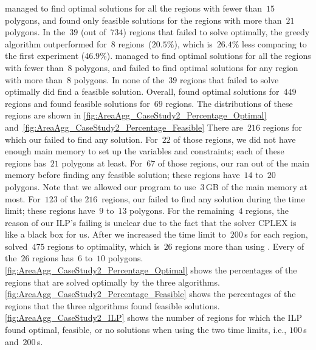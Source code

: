 \Astar managed to find optimal solutions 
for all the regions with fewer than~$15$ polygons, and 
found only feasible solutions for the regions 
with more than~$21$ polygons.
%
In the~$39$ (out of~$734$) regions 
that \Astar failed to solve optimally,
the greedy algorithm outperformed \Astar 
for~$8$ regions~($20.5\%$), 
which is~$26.4\%$ less comparing to the first experiment ($46.9\%$).
%
\ILPOne managed to find optimal solutions 
for all the regions with fewer than~$8$ polygons,
and failed to find optimal solutions
for any region with more than~$8$ polygons.
In none of the~$39$ regions 
that \Astar failed to solve optimally
did \ILPOne find a feasible solution.
Overall, \ILPOne 
found optimal solutions for~$449$ regions
and found feasible solutions for~$69$ regions.
The distributions of these regions are shown in
\figs\ref{fig:AreaAgg_CaseStudy2_Percentage_Optimal}
and~\fig\ref{fig:AreaAgg_CaseStudy2_Percentage_Feasible}
There are~$216$ regions for which 
our \ILPOne failed to find any solution.
For~$22$ of those regions, 
we did not have enough main memory 
to set up the variables and constraints;
each of these regions has~$21$ polygons at least.
For~$67$ of those regions, 
our \ILPOne ran out of the main memory 
before finding any feasible solution;
these regions have~$14$ to~$20$ polygons.
Note that we allowed our program to use~$3\,$GB 
of the main memory at most.
For~$123$ of the $216$~regions, 
our \ILPOne failed to find any solution
during the time limit;
these regions have~$9$ to~$13$ polygons.
For the remaining~$4$ regions, 
the reason of our ILP's failing is unclear 
due to the fact that 
the solver CPLEX is like a black box for us.
After we increased the time limit to~$200\,$s for each region, 
\ILPTwo solved~$475$ regions to optimality, which 
is~$26$ regions more than using \ILPOne.
Every of the~$26$ regions has~$6$ to~$10$ polygons.
\fig\ref{fig:AreaAgg_CaseStudy2_Percentage_Optimal}
shows the percentages of the regions 
that are solved optimally by the three algorithms.
\fig\ref{fig:AreaAgg_CaseStudy2_Percentage_Feasible} 
shows the percentages of the regions 
that the three algorithms found feasible solutions.
\fig\ref{fig:AreaAgg_CaseStudy2_ILP} shows 
the number of regions for which 
the ILP found optimal, feasible, or no solutions 
when using the two time limits, i.e., $100\,$s and~$200\,$s.


